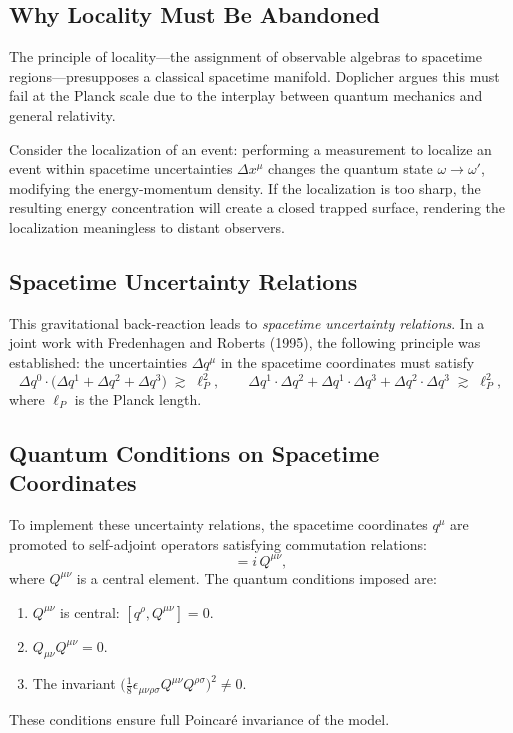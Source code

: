 \documentclass[11pt,a4paper]{article}
\begin{document}
\subsection{Why Locality Must Be Abandoned}

The principle of locality---the assignment of observable algebras to
spacetime regions---presupposes a classical spacetime manifold. Doplicher
argues this must fail at the Planck scale due to the interplay between
quantum mechanics and general relativity.

Consider the localization of an event: performing a measurement to localize
an event within spacetime uncertainties $\Delta x^\mu$ changes the quantum
state $\omega \to \omega'$, modifying the energy-momentum density. If the
localization is too sharp, the resulting energy concentration will create
a closed trapped surface, rendering the localization meaningless to distant
observers.

\subsection{Spacetime Uncertainty Relations}

This gravitational back-reaction leads to \emph{spacetime uncertainty relations}.
In a joint work with Fredenhagen and Roberts (1995), the following principle
was established: the uncertainties $\Delta q^\mu$ in the spacetime coordinates
must satisfy
\begin{equation}
  \Delta q^0 \cdot \bigl(\Delta q^1 + \Delta q^2 + \Delta q^3\bigr)
  \;\gtrsim\; \ell_P^2,
  \qquad
  \Delta q^1 \cdot \Delta q^2 + \Delta q^1 \cdot \Delta q^3
  + \Delta q^2 \cdot \Delta q^3 \;\gtrsim\; \ell_P^2,
\end{equation}
where $\ell_P$ is the Planck length.

\subsection{Quantum Conditions on Spacetime Coordinates}

To implement these uncertainty relations, the spacetime coordinates
$q^\mu$ are promoted to self-adjoint operators satisfying commutation
relations:
\begin{equation}
  [q^\mu, q^\nu] = i\, Q^{\mu\nu},
\end{equation}
where $Q^{\mu\nu}$ is a central element. The quantum conditions imposed are:
\begin{enumerate}[nosep]
  \item $Q^{\mu\nu}$ is central: $[q^\rho, Q^{\mu\nu}] = 0$.
  \item $Q_{\mu\nu} Q^{\mu\nu} = 0$.
  \item The invariant $\bigl(\tfrac{1}{8}\epsilon_{\mu\nu\rho\sigma}
        Q^{\mu\nu} Q^{\rho\sigma}\bigr)^2 \neq 0$.
\end{enumerate}
These conditions ensure full Poincar\'e invariance of the model.
\end{document}

